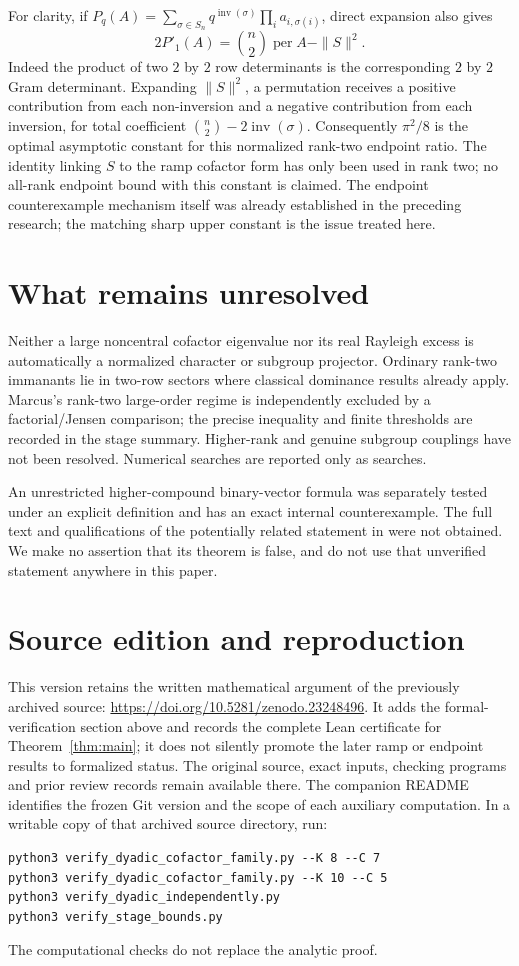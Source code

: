 \documentclass[11pt]{article}
\DeclareMathOperator{\per}{per}
\begin{document}
For clarity, if $P_q(A)=\sum_{\sigma\in S_n}q^{\operatorname{inv}(\sigma)}
\prod_i a_{i,\sigma(i)}$, direct expansion also gives
\[
 2P'_1(A)=\binom n2\per A-\|S\|^2.
\]
Indeed the product of two $2$ by $2$ row determinants is the corresponding
$2$ by $2$ Gram determinant. Expanding $\|S\|^2$, a permutation receives a
positive contribution from each non-inversion and a negative contribution
from each inversion, for total coefficient $\binom n2-2\operatorname{inv}(\sigma)$.
Consequently $\pi^2/8$ is the optimal asymptotic constant for this normalized
rank-two endpoint ratio. The identity linking $S$ to the ramp cofactor form
has only been used in rank two; no all-rank endpoint bound with this constant
is claimed. The endpoint counterexample mechanism itself was already
established in the preceding research; the matching sharp upper constant is
the issue treated here.

\section{What remains unresolved}
Neither a large noncentral cofactor eigenvalue nor its real Rayleigh excess
is automatically a normalized character or subgroup projector. Ordinary
rank-two immanants lie in two-row sectors where classical dominance results
already apply. Marcus's rank-two large-order regime is independently excluded
by a factorial/Jensen comparison; the precise inequality and finite thresholds
are recorded in the stage summary. Higher-rank and genuine subgroup couplings
have not been resolved. Numerical searches are reported only as searches.

An unrestricted higher-compound binary-vector formula was separately tested
under an explicit definition and has an exact internal counterexample. The
full text and qualifications of the potentially related statement in
\cite{pate08} were not obtained. We make no assertion that its theorem is
false, and do not use that unverified statement anywhere in this paper.

\clearpage

\section*{Source edition and reproduction}
This version retains the written mathematical argument of the previously
archived source: \url{https://doi.org/10.5281/zenodo.23248496}. It adds the
formal-verification section above and records the complete Lean certificate
for Theorem~\ref{thm:main}; it does not silently promote the later ramp or
endpoint results to formalized status. The original source, exact inputs,
checking programs and prior review records remain available there. The
companion README identifies the frozen Git version and the scope of each
auxiliary computation.
In a writable copy of that archived source directory, run:
\begin{verbatim}
python3 verify_dyadic_cofactor_family.py --K 8 --C 7
python3 verify_dyadic_cofactor_family.py --K 10 --C 5
python3 verify_dyadic_independently.py
python3 verify_stage_bounds.py
\end{verbatim}
The computational checks do not replace the analytic proof.
\end{document}
